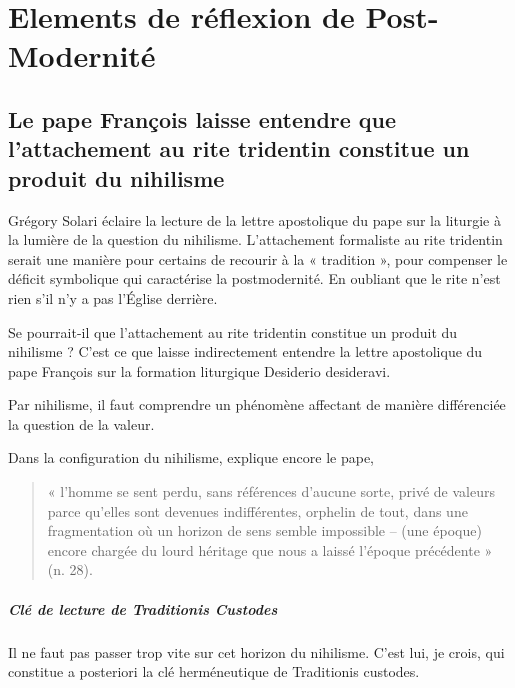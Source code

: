 \chapter{Elements de réflexion de Post-Modernité}

\section{Le pape François laisse entendre que l’attachement au rite tridentin constitue un produit du nihilisme}
 \begin{Synthesis}
     Grégory Solari éclaire la lecture de la lettre apostolique du pape sur la liturgie à la lumière de la question du nihilisme. L’attachement formaliste au rite tridentin serait une manière pour certains de recourir à la « tradition », pour compenser le déficit symbolique qui caractérise la postmodernité. En oubliant que le rite n’est rien s’il n’y a pas l’Église derrière.
 \end{Synthesis}



Se pourrait-il que l’attachement au rite tridentin constitue un produit du nihilisme ? C’est ce que laisse indirectement entendre la lettre apostolique du pape François sur la formation liturgique Desiderio desideravi. 

\begin{Def}[Nihilisme]
Par nihilisme, il faut comprendre un phénomène affectant de manière différenciée la question de la valeur. 
\end{Def}

Dans la configuration du nihilisme, explique encore le pape, \begin{quote}
    « l’homme se sent perdu, sans références d’aucune sorte, privé de valeurs parce qu’elles sont devenues indifférentes, orphelin de tout, dans une fragmentation où un horizon de sens semble impossible – (une époque) encore chargée du lourd héritage que nous a laissé l’époque précédente » (n. 28).
\end{quote}  

\paragraph{Clé de lecture de Traditionis Custodes } Il ne faut pas passer trop vite sur cet horizon du nihilisme. C’est lui, je crois, qui constitue a posteriori la clé herméneutique de Traditionis custodes.

